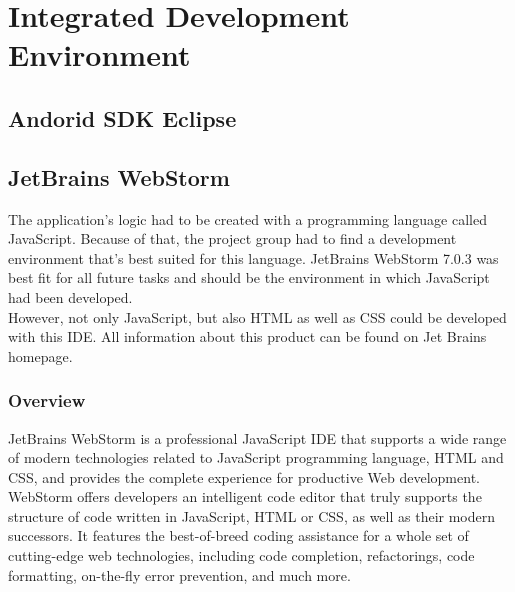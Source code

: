 \chapter{Integrated Development Environment}


\section{Andorid SDK Eclipse}




















\section{JetBrains WebStorm}
The application’s logic had to be created with a programming language called JavaScript. Because of that, the project group had to find a development environment that’s best suited for this language. JetBrains WebStorm 7.0.3 was best fit for all future tasks and should be the environment in which JavaScript had been developed. 
\\

However, not only JavaScript, but also HTML as well as CSS could be developed with this IDE. All information about this product can be found on Jet Brains homepage.\cite{webstorm}
\subsection{Overview}
JetBrains WebStorm is a professional JavaScript IDE that supports a wide range of modern technologies related to JavaScript programming language, HTML and  CSS, and provides the complete experience for productive Web development.
\\

WebStorm offers developers an intelligent code editor that truly supports the structure of code written in JavaScript, HTML or CSS, as well as their modern  successors. It features the best-of-breed coding assistance for a whole set of  cutting-edge web technologies, including code completion, refactorings, code formatting, on-the-fly error prevention, and much more. 
\\

